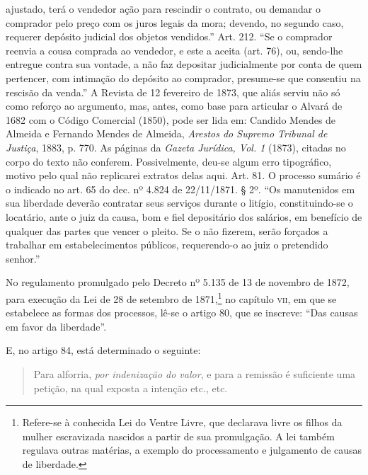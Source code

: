 {  ajustado, terá o vendedor ação para rescindir o contrato, ou demandar
  o comprador pelo preço com os juros legais da mora; devendo, no
  segundo caso, requerer depósito judicial dos objetos vendidos.'' Art.
  212. ``Se o comprador reenvia a cousa comprada ao vendedor, e este a
  aceita (art. 76), ou, sendo-lhe entregue contra sua vontade, a não faz
  depositar judicialmente por conta de quem pertencer, com intimação do
  depósito ao comprador, presume-se que consentiu na rescisão da venda.''
  A Revista de 12 fevereiro de 1873, que aliás serviu não só como
  reforço ao argumento, mas, antes, como base para articular o
  Alvará de 1682 com o Código Comercial (1850), pode ser lida em: 
 Candido Mendes de Almeida e Fernando Mendes de Almeida,
 \emph{Arestos do Supremo Tribunal de Justiça}, 1883, p. 770. As páginas da
  \emph{Gazeta Jurídica, Vol. 1} (1873), citadas no corpo do texto não
  conferem. Possivelmente, deu-se algum erro tipográfico, motivo pelo
  qual não replicarei extratos delas aqui. Art. 81. O processo sumário é
  o indicado no art. 65 do dec. nº 4.824 de 22/11/1871. § 2º. ``Os
  manutenidos em sua liberdade deverão contratar seus serviços durante o
  litígio, constituindo-se o locatário, ante o juiz da causa, bom e fiel
  depositário dos salários, em benefício de qualquer das partes que
  vencer o pleito. Se o não fizerem, serão forçados a trabalhar em
  estabelecimentos públicos, requerendo-o ao juiz o pretendido senhor.''}

No regulamento promulgado pelo Decreto nº 5.135 de 13 de novembro de
1872, para execução da Lei de 28 de setembro de 1871,\footnote{
  Refere-se à conhecida Lei do Ventre Livre, que declarava livre os
  filhos da mulher escravizada nascidos a partir de sua promulgação.
  A lei também regulava outras matérias, a exemplo do processamento
  e julgamento de causas de liberdade.} no capítulo \textsc{vii}, em que se
estabelece as formas dos processos, lê-se o artigo 80, que se inscreve:
``Das causas em favor da liberdade''.

E, no artigo 84, está determinado o seguinte:

\begin{quote}
Para alforria, \emph{por indenização do valor}, e para a remissão é
suficiente uma petição, na qual exposta a intenção etc., etc.
\end{quote}

